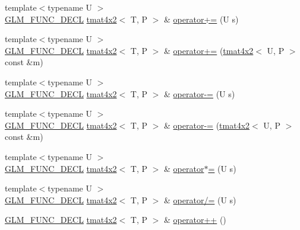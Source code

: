 \begin{DoxyCompactItemize}
\item 
{\footnotesize template$<$typename U $>$ }\\\hyperlink{setup_8hpp_ab2d052de21a70539923e9bcbf6e83a51}{G\+L\+M\+\_\+\+F\+U\+N\+C\+\_\+\+D\+E\+CL} \hyperlink{structglm_1_1detail_1_1tmat4x2}{tmat4x2}$<$ T, P $>$ \& \hyperlink{structglm_1_1detail_1_1tmat4x2_afc1384cd2981f135bf21be4f2405298d}{operator+=} (U s)
\item 
{\footnotesize template$<$typename U $>$ }\\\hyperlink{setup_8hpp_ab2d052de21a70539923e9bcbf6e83a51}{G\+L\+M\+\_\+\+F\+U\+N\+C\+\_\+\+D\+E\+CL} \hyperlink{structglm_1_1detail_1_1tmat4x2}{tmat4x2}$<$ T, P $>$ \& \hyperlink{structglm_1_1detail_1_1tmat4x2_a65939b2c728dde98658056e9f1e68b2a}{operator+=} (\hyperlink{structglm_1_1detail_1_1tmat4x2}{tmat4x2}$<$ U, P $>$ const \&m)
\item 
{\footnotesize template$<$typename U $>$ }\\\hyperlink{setup_8hpp_ab2d052de21a70539923e9bcbf6e83a51}{G\+L\+M\+\_\+\+F\+U\+N\+C\+\_\+\+D\+E\+CL} \hyperlink{structglm_1_1detail_1_1tmat4x2}{tmat4x2}$<$ T, P $>$ \& \hyperlink{structglm_1_1detail_1_1tmat4x2_aa29ebe7a63b94a6313746b46e249bbab}{operator-\/=} (U s)
\item 
{\footnotesize template$<$typename U $>$ }\\\hyperlink{setup_8hpp_ab2d052de21a70539923e9bcbf6e83a51}{G\+L\+M\+\_\+\+F\+U\+N\+C\+\_\+\+D\+E\+CL} \hyperlink{structglm_1_1detail_1_1tmat4x2}{tmat4x2}$<$ T, P $>$ \& \hyperlink{structglm_1_1detail_1_1tmat4x2_a1090317fd177133e27ad3aeeb38d931b}{operator-\/=} (\hyperlink{structglm_1_1detail_1_1tmat4x2}{tmat4x2}$<$ U, P $>$ const \&m)
\item 
{\footnotesize template$<$typename U $>$ }\\\hyperlink{setup_8hpp_ab2d052de21a70539923e9bcbf6e83a51}{G\+L\+M\+\_\+\+F\+U\+N\+C\+\_\+\+D\+E\+CL} \hyperlink{structglm_1_1detail_1_1tmat4x2}{tmat4x2}$<$ T, P $>$ \& \hyperlink{structglm_1_1detail_1_1tmat4x2_a64135bb813a4b55236de482a753a0b94}{operator$\ast$=} (U s)
\item 
{\footnotesize template$<$typename U $>$ }\\\hyperlink{setup_8hpp_ab2d052de21a70539923e9bcbf6e83a51}{G\+L\+M\+\_\+\+F\+U\+N\+C\+\_\+\+D\+E\+CL} \hyperlink{structglm_1_1detail_1_1tmat4x2}{tmat4x2}$<$ T, P $>$ \& \hyperlink{structglm_1_1detail_1_1tmat4x2_a1d3b62413da2a83289fcba7569ff8486}{operator/=} (U s)
\item 
\hyperlink{setup_8hpp_ab2d052de21a70539923e9bcbf6e83a51}{G\+L\+M\+\_\+\+F\+U\+N\+C\+\_\+\+D\+E\+CL} \hyperlink{structglm_1_1detail_1_1tmat4x2}{tmat4x2}$<$ T, P $>$ \& \hyperlink{structglm_1_1detail_1_1tmat4x2_a601812e90a1d3f22cecdfded3e440d70}{operator++} ()

\end{DoxyCompactItemize}

